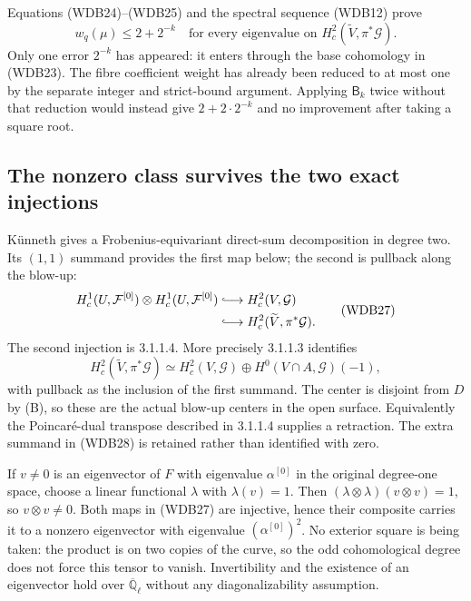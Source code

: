 Equations (WDB24)--(WDB25) and the spectral sequence (WDB12) prove
\[
 w_q(\mu)\le2+2^{-k}
 \quad\text{for every eigenvalue on }
 H_c^2(\widetilde V,\pi^*\mathcal G).
 \tag{WDB26}
\]
Only one error \(2^{-k}\) has appeared: it enters through the
base cohomology in (WDB23). The fibre coefficient weight has already
been reduced to at most one by the separate integer and strict-bound
argument. Applying \(\mathsf B_k\) twice without that reduction
would instead give \(2+2\cdot2^{-k}\) and no improvement after
taking a square root.

\subsection{The nonzero class survives the two exact injections}

K\"unneth gives a Frobenius-equivariant direct-sum decomposition in
degree two. Its \((1,1)\) summand provides the first map below;
the second is pullback along the blow-up:
\[
 \begin{split}
 H_c^1(U,\mathcal F^{[0]})\otimes
 H_c^1(U,\mathcal F^{[0]})
 &\lhook\joinrel\longrightarrow H_c^2(V,\mathcal G)\\
 &\lhook\joinrel\longrightarrow
 H_c^2(\widetilde V,\pi^*\mathcal G).
 \end{split}
 \tag{WDB27}
\]
The second injection is 3.1.1.4. More precisely 3.1.1.3 identifies
\[
 H_c^2(\widetilde V,\pi^*\mathcal G)
 \simeq H_c^2(V,\mathcal G)
       \oplus H^0(V\cap A,\mathcal G)(-1),
 \tag{WDB28}
\]
with pullback as the inclusion of the first summand. The center is
disjoint from \(D\) by (B), so these are the actual blow-up centers
in the open surface. Equivalently the Poincar\'e-dual transpose
described in 3.1.1.4 supplies a retraction. The extra summand in
(WDB28) is retained rather than identified with zero.

If \(v\ne0\) is an eigenvector of \(F\) with eigenvalue
\(\alpha^{[0]}\) in the original degree-one space, choose a
linear functional \(\lambda\) with \(\lambda(v)=1\). Then
\((\lambda\otimes\lambda)(v\otimes v)=1\), so
\(v\otimes v\ne0\). Both maps in (WDB27) are injective, hence
their composite carries it to a nonzero eigenvector with eigenvalue
\((\alpha^{[0]})^2\). No exterior square is being taken:
the product is on two copies of the curve, so the odd cohomological
degree does not force this tensor to vanish. Invertibility and the
existence of an eigenvector hold over \(\overline{\mathbb Q}_\ell\)
without any diagonalizability assumption.

